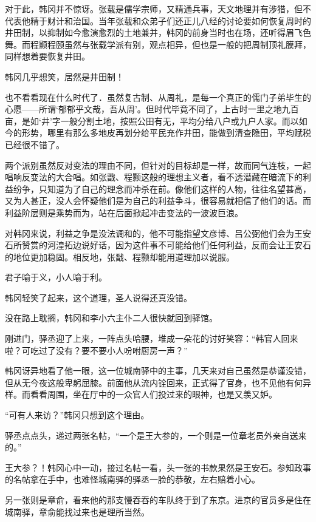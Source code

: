 对于此，韩冈并不惊讶。张载是儒学宗师，又精通兵事，天文地理并有涉猎，但不代表他精于财计和治国。当年张载和众弟子们还正儿八经的讨论要如何恢复周时的井田制，以抑制如今愈演愈烈的土地兼并，韩冈的前身当时也在场，还听得眉飞色舞。而程颢程颐虽然与张载学派有别，观点相异，但也是一般的把周制顶礼膜拜，同样想着要恢复井田。

韩冈几乎想笑，居然是井田制！

也不看看现在什么时代了．虽然复古制、从周礼，是每一个真正的儒门子弟毕生的心愿——所谓‘郁郁乎文哉，吾从周’。但时代毕竟不同了，上古时一里之地九百亩，是如‘井’字一般分割土地，按照公田有无，平均分给八户或九户人家。而以如今的形势，哪里有那么多地皮再划分给平民充作井田，能做到清查隐田，平均赋税已经很不错了。

两个派别虽然反对变法的理由不同，但针对的目标却是一样，故而同气连枝，一起唱响反变法的大合唱。如张戬、程颢这般的理想主义者，看不透潜藏在暗流下的利益纷争，只知道为了自己的理念而冲杀在前。像他们这样的人物，往往名望甚高，又为人甚正，没人会怀疑他们是为自己的利益争斗，很容易就相信了他们的话。而利益阶层则是乘势而为，站在后面掀起冲击变法的一波波巨浪。

对韩冈来说，利益之争是没法调和的，他不可能指望文彦博、吕公弼他们会为王安石所赞赏的河湟拓边说好话，因为这件事不可能给他们任何利益，反而会让王安石的地位更加稳固。相反地，张戬、程颢却能用道理加以说服。

君子喻于义，小人喻于利。

韩冈轻笑了起来，这个道理，圣人说得还真没错。

没在路上耽搁，韩冈和李小六主仆二人很快就回到驿馆。

刚进门，驿丞迎了上来，一阵点头哈腰，堆成一朵花的讨好笑容：“韩官人回来啦？可吃过了没有？要不要小人吩咐厨房一声？”

韩冈讶异地看了他一眼，这一位城南驿中的主事，几天来对自己虽然是恭谨没错，但从无今夜这般卑躬屈膝。前面他从流内铨回来，正式得了官身，也不见他有何异样。而看看周围，坐在厅中的一众官人们投过来的眼神，也是又羡又妒。

“可有人来访？”韩冈只想到这个理由。

驿丞点点头，递过两张名帖，“一个是王大参的，一个则是一位章老员外亲自送来的。”

王大参？！韩冈心中一动，接过名帖一看，头一张的书款果然是王安石。参知政事的名帖拿在手中，也难怪城南驿的驿丞一脸的恭敬，左右赔着小心。

另一张则是章俞，看来他的那支慢吞吞的车队终于到了东京。进京的官员多是住在城南驿，章俞能找过来也是理所当然。

